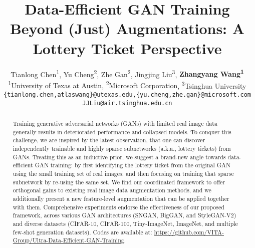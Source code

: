 \documentclass{article}
\title{Data-Efficient GAN Training Beyond (Just) Augmentations: A Lottery Ticket Perspective}
\author{%
  Tianlong Chen\textsuperscript{1}, Yu Cheng\textsuperscript{2}, Zhe Gan\textsuperscript{2}, Jingjing Liu\textsuperscript{3}, \textbf{Zhangyang Wang\textsuperscript{1}}\\
  {\textsuperscript{1}University of Texas at Austin, \textsuperscript{2}Microsoft Corporation}, \textsuperscript{3}Tsinghua University\\
  \small{\texttt{\{tianlong.chen,atlaswang\}@utexas.edu,\{yu.cheng,zhe.gan\}@microsoft.com}} \\
  \small{\texttt{JJLiu@air.tsinghua.edu.cn}} \\
}
\begin{document}
\maketitle

\begin{abstract}
Training generative adversarial networks (GANs) with limited real image data generally results in deteriorated performance and collapsed models. To conquer this challenge, we are inspired by the latest observation, that one can discover independently trainable and highly sparse subnetworks (a.k.a., lottery tickets) from GANs. Treating this as an inductive prior, we suggest a brand-new angle towards data-efficient GAN training: by first identifying the lottery ticket from the original GAN using the small training set of real images; and then focusing on training that sparse subnetwork by re-using the same set. We find our coordinated framework to offer orthogonal gains to existing real image data augmentation methods, and we additionally present a new feature-level augmentation that can be applied together with them. Comprehensive experiments endorse the effectiveness of our proposed framework, across various GAN architectures (SNGAN, BigGAN, and StyleGAN-V2) and diverse datasets (CIFAR-10, CIFAR-100, Tiny-ImageNet, ImageNet, and multiple few-shot generation datasets). Codes are available at: \url{https://github.com/VITA-Group/Ultra-Data-Efficient-GAN-Training}.

\end{abstract}
\end{document}
